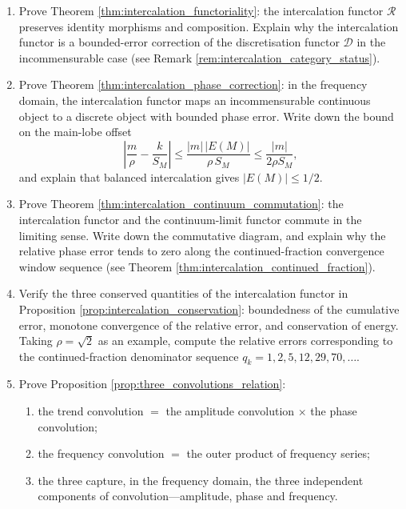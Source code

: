 \begin{enumerate}[leftmargin=3em, label=\textbf{Exercise \arabic*}]
    \item Prove Theorem \ref{thm:intercalation_functoriality}:
    the intercalation functor $\mathcal{R}$ preserves identity morphisms and composition.
    Explain why the intercalation functor is a bounded-error correction of the discretisation functor $\mathcal{D}$ in the incommensurable case
    (see Remark \ref{rem:intercalation_category_status}).

    \item Prove Theorem \ref{thm:intercalation_phase_correction}:
    in the frequency domain, the intercalation functor maps an incommensurable continuous object to a discrete object with bounded phase error.
    Write down the bound on the main-lobe offset
    \[
    \left|\frac{m}{\rho}-\frac{k}{S_M}\right|
    \le\frac{|m|\,|E(M)|}{\rho\,S_M}\le\frac{|m|}{2\rho S_M},
    \]
    and explain that balanced intercalation gives $|E(M)|\le1/2$.

    \item Prove Theorem \ref{thm:intercalation_continuum_commutation}:
    the intercalation functor and the continuum-limit functor commute in the limiting sense.
    Write down the commutative diagram, and explain why the relative phase error tends to zero along the continued-fraction convergence window sequence
    (see Theorem \ref{thm:intercalation_continued_fraction}).

    \item Verify the three conserved quantities of the intercalation functor in Proposition \ref{prop:intercalation_conservation}:
    boundedness of the cumulative error, monotone convergence of the relative error, and conservation of energy.
    Taking $\rho=\sqrt{2}$ as an example, compute the relative errors corresponding to
    the continued-fraction denominator sequence $q_k=1,2,5,12,29,70,\dots$.

    \item Prove Proposition \ref{prop:three_convolutions_relation}:
    \begin{enumerate}[label=(\roman*)]
        \item the trend convolution $=$ the amplitude convolution $\times$ the phase convolution;
        \item the frequency convolution $=$ the outer product of frequency series;
        \item the three capture, in the frequency domain, the three independent components of convolution---amplitude, phase and frequency.
    \end{enumerate}


\end{enumerate}
